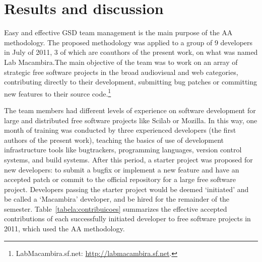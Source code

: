 \documentclass{article}
\begin{document}

\section{Results and discussion}
\label{results}

Easy and effective GSD team management is the main purpose of the AA
methodology. The proposed methodology was applied to a group of 9 developers in
July of 2011, 3 of which are coauthors of the present work, on what was named Lab
Macambira.The main objective of the team was to work on an array of strategic free software
projects in the broad audiovisual and web categories, contributing directly to
their development, submitting bug patches or committing new features to their
source code.\footnote{LabMacambira.sf.net: \url{http://labmacambira.sf.net}.} 

The team members had different levels of experience on software development for
large and distributed free software projects like Scilab or Mozilla. In this
way, one month of training was conducted by three experienced developers (the
first authors of the present work), teaching
the basics of use of development infrastructure tools like bugtrackers, programming
languages, version control systems, and build systems. After this period, a
starter project was proposed for new developers: to submit a bugfix or implement
a new feature and have an accepted
patch or commit to the official repository for a large free
software project.  Developers passing the starter project would be deemed
`initiated' and be called a `Macambira' developer, and be hired for the
remainder of the semester.
Table~\ref{tabela:contribuicoes} summarizes the effective accepted contributions
of each successfully initiated developer to free software projects in 2011,
which used the AA methodology.

\end{document}
